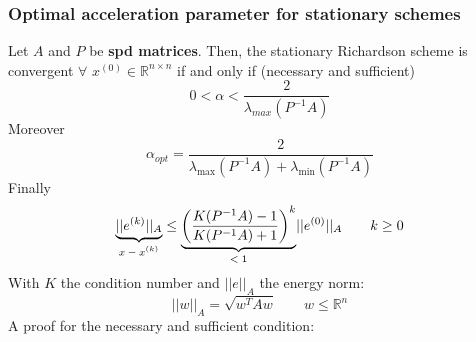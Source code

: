     \subsubsection{Optimal acceleration parameter for stationary schemes}
    Let $A$ and $P$ be \textbf{spd matrices}. Then, the stationary Richardson scheme is convergent $ \forall\,\,x^{(0)}\in\mathbb{R}^{n\times n}$ if and only if (necessary and sufficient)
    $$
    0<\alpha<\frac{2}{\lambda_{max}(P^{-1}A)}
    $$
    Moreover
    $$
    \alpha_{opt}=\frac{2}{\lambda_{\max}(P^{-1}A)+\lambda_{\min}(P^{-1}A)}
    $$
    Finally
    $$
    \underlabel{||e^{(k)}||_A}{$x-x^{(k)}$}\leq
    \underlabel{
        \left(
            \frac{
                K(P^{-1}A)-1
            }{
                K(P^{-1}A)+1
            }
        \right)^k
    }{
        $<1$
    }||e^{(0)}||_A
    \qquad k\geq 0
    $$
    With $K$ the condition number and $||e||_A$ the energy norm:
    $$
    ||w||_A=\sqrt{w^TAw}\qquad w\leq\mathbb{R}^n
    $$
    A proof for the necessary and sufficient condition:
